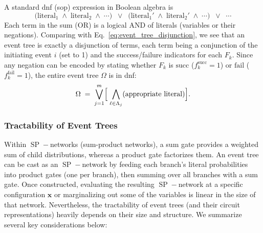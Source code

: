 A standard \acrshort{dnf} (\acrshort{sop}) expression in Boolean algebra is
\[
    \bigl(\text{literal}_1 \;\wedge\;\text{literal}_2 \;\wedge\;\cdots\bigr)
    \;\;\lor\;\;
    \bigl(\text{literal}_{1}' \;\wedge\;\text{literal}_{2}' \;\wedge\;\cdots\bigr)
    \;\;\lor\;\;\cdots
\]
Each term in the sum (OR) is a logical AND of literals (variables or their negations). Comparing with Eq.~\eqref{eq:event_tree_disjunction}, we see that an event tree is exactly a disjunction of terms, each term being a conjunction of the initiating event \(i\) (set to 1) and the success/failure indicators for each \(F_k\). Since any negation can be encoded by stating whether \(F_k\) is \(\text{succ}\) (\(f_k^{\text{succ}}=1\)) or \(\text{fail}\) (\(f_k^{\text{fail}}=1\)), the entire event tree \(\Omega\) is in \acrshort{dnf}:
\[
    \Omega \;=\; 
    \bigvee_{j=1}^m
    \Bigl[
        \;\bigwedge_{\ell\in \Lambda_j}
        (\text{appropriate literal})
    \Bigr].
\]

\subsubsection{Tractability of Event Trees}
\label{sec:tractability_event_trees}

Within \(\operatorname{SP}\!-\)networks (sum-product networks), a sum gate provides a weighted sum of child distributions, whereas a product gate factorizes them.  An event tree can be cast as an \(\operatorname{SP}\!-\)network by feeding each branch’s literal probabilities into product gates (one per branch), then summing over all branches with a sum gate.  Once constructed, evaluating the resulting \(\operatorname{SP}\!-\)network at a specific configuration \(\mathbf{x}\) or marginalizing out some of the variables is linear in the size of that network.  Nevertheless, the tractability of event trees (and their circuit representations) heavily depends on their size and structure.  We summarize several key considerations below:


